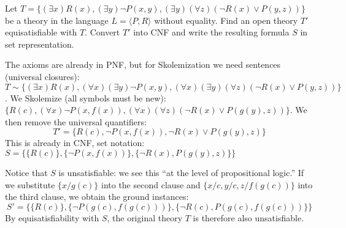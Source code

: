 \begin{problem}
    
    Let $T=\{(\exists x)R(x), (\exists y)\neg P(x,y), (\exists y)(\forall z)(\neg R(x)\vee P(y,z))\}$ be a theory in the language $L=\langle P,R\rangle$ without equality. Find an open theory $T'$ equisatisfiable with $T$. Convert $T'$ into CNF and write the resulting formula $S$ in set representation.

    \begin{solution}
        The axioms are already in PNF, but for Skolemization we need sentences (universal closures): $T\sim\{(\exists x)R(x), (\forall x)(\exists y)\neg P(x,y), (\forall x)(\exists y)(\forall z)(\neg R(x)\vee P(y,z))\}$. We Skolemize (all symbols must be new):
        $\{R(c), (\forall x)\neg P(x,f(x)), (\forall x)(\forall z)(\neg R(x)\vee P(g(y),z))\}$. We then remove the universal quantifiers:
        $$T'=\{R(c), \neg P(x,f(x)), \neg R(x)\vee P(g(y),z)\}$$
        This is already in CNF, set notation: $S=\{\{R(c)\},\{\neg P(x,f(x))\},\{\neg R(x),P(g(y),z)\}\}$
        
        Notice that $S$ is unsatisfiable: we see this “at the level of propositional logic.” If we substitute $\{x/g(c)\}$ into the second clause and $\{x/c,y/c,z/f(g(c))\}$ into the third clause, we obtain the ground instances:
        $$
        S'=\{\{R(c)\},\{\neg P(g(c),f(g(c)))\},\{\neg R(c),P(g(c),f(g(c)))\}\}
        $$
        By equisatisfiability with $S$, the original theory $T$ is therefore also unsatisfiable.        
    \end{solution}

\end{problem}


